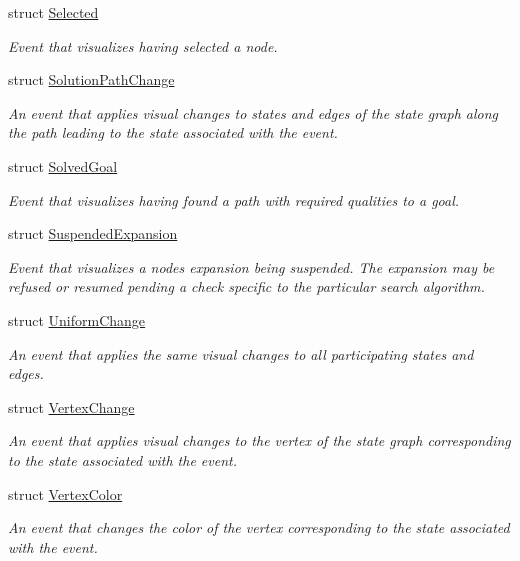 \begin{DoxyCompactItemize}
struct \hyperlink{structslb_1_1ext_1_1event_1_1Selected}{Selected}
\begin{DoxyCompactList}\small\item\em Event that visualizes having selected a node. \end{DoxyCompactList}\item 
struct \hyperlink{structslb_1_1ext_1_1event_1_1SolutionPathChange}{Solution\+Path\+Change}
\begin{DoxyCompactList}\small\item\em An event that applies visual changes to states and edges of the state graph along the path leading to the state associated with the event. \end{DoxyCompactList}\item 
struct \hyperlink{structslb_1_1ext_1_1event_1_1SolvedGoal}{Solved\+Goal}
\begin{DoxyCompactList}\small\item\em Event that visualizes having found a path with required qualities to a goal. \end{DoxyCompactList}\item 
struct \hyperlink{structslb_1_1ext_1_1event_1_1SuspendedExpansion}{Suspended\+Expansion}
\begin{DoxyCompactList}\small\item\em Event that visualizes a node\textquotesingle{}s expansion being suspended. The expansion may be refused or resumed pending a check specific to the particular search algorithm. \end{DoxyCompactList}\item 
struct \hyperlink{structslb_1_1ext_1_1event_1_1UniformChange}{Uniform\+Change}
\begin{DoxyCompactList}\small\item\em An event that applies the same visual changes to all participating states and edges. \end{DoxyCompactList}\item 
struct \hyperlink{structslb_1_1ext_1_1event_1_1VertexChange}{Vertex\+Change}
\begin{DoxyCompactList}\small\item\em An event that applies visual changes to the vertex of the state graph corresponding to the state associated with the event. \end{DoxyCompactList}\item 
struct \hyperlink{structslb_1_1ext_1_1event_1_1VertexColor}{Vertex\+Color}
\begin{DoxyCompactList}\small\item\em An event that changes the color of the vertex corresponding to the state associated with the event. \end{DoxyCompactList}\item 

\end{DoxyCompactItemize}
